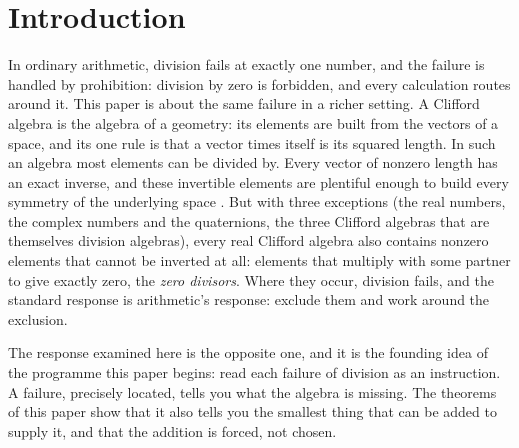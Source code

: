 \documentclass[11pt]{article}
\theoremstyle{definition}
\theoremstyle{plain}
\begin{document}
\noindent{}
\newpage

\section{Introduction}

\label{c:note.transport.setting-introduction}
In ordinary arithmetic, division fails at exactly one number, and the failure is handled by prohibition: division by zero is forbidden, and every calculation routes around it. This paper is about the same failure in a richer setting. A Clifford algebra is the algebra of a geometry: its elements are built from the vectors of a space, and its one rule is that a vector times itself is its squared length. In such an algebra most elements can be divided by. Every vector of nonzero length has an exact inverse, and these invertible elements are plentiful enough to build every symmetry of the underlying space \cite{HestenesSobczyk1984, DoranLasenby2003}. But with three exceptions (the real numbers, the complex numbers and the quaternions, the three Clifford algebras that are themselves division algebras), every real Clifford algebra also contains nonzero elements that cannot be inverted at all: elements that multiply with some partner to give exactly zero, the \emph{zero divisors}. Where they occur, division fails, and the standard response is arithmetic's response: exclude them and work around the exclusion.

The response examined here is the opposite one, and it is the founding idea of the programme this paper begins: read each failure of division as an instruction. A failure, precisely located, tells you what the algebra is missing. The theorems of this paper show that it also tells you the smallest thing that can be added to supply it, and that the addition is forced, not chosen.
\end{document}
